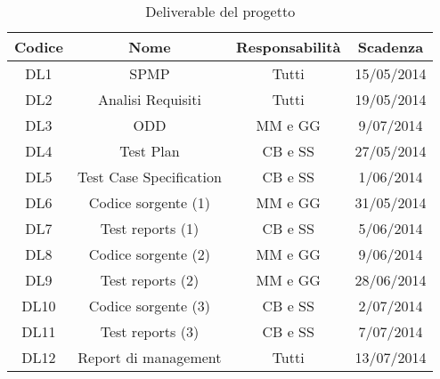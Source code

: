 \begin{table}[b]
	\begin{tabular}{|c|c|c|c|}
	\hline
	\textbf{Codice} & \textbf{Nome} & \textbf{Responsabilità} & \textbf{Scadenza}\\
	\hline
	DL1	& SPMP						& Tutti			& 15/05/2014\\
	\hline
	DL2	& Analisi Requisiti			& Tutti			& 19/05/2014\\
	\hline
	DL3	& ODD						& MM e GG		& 9/07/2014\\
	\hline
	DL4 & Test Plan					& CB e SS		& 27/05/2014\\
	\hline
	DL5 & Test Case Specification	& CB e SS	 	& 1/06/2014\\
	\hline
	DL6 & Codice sorgente (1)		& MM e GG		& 31/05/2014\\
	\hline
	DL7 & Test reports (1)			& CB e SS		& 5/06/2014\\
	\hline
	DL8 & Codice sorgente (2)		& MM e GG		& 9/06/2014\\
	\hline
	DL9 & Test reports (2)			& MM e GG		& 28/06/2014\\
	\hline
	DL10& Codice sorgente (3)		& CB e SS		& 2/07/2014\\
	\hline
	DL11& Test reports (3)			& CB e SS		& 7/07/2014\\
	\hline
	DL12& Report di management		& Tutti			& 13/07/2014\\
	\hline
	\end{tabular}
	\caption{Deliverable del progetto}
	\label{overview:deliverable}
\end{table}